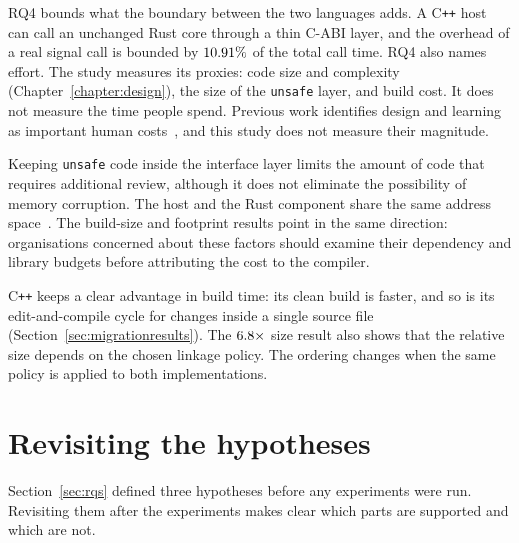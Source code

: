 \documentclass[english,oneside,a4paper,censored,csm,software-track-2020]{HYthesisML}
\begin{document}
RQ4 bounds what the boundary between the two languages adds. A C\texttt{++} host
can call an unchanged Rust core through a thin C-ABI layer, and the overhead of a
real signal call is bounded by $10.91\%$ of the total call time. RQ4
also names effort. The study measures its proxies: code size and complexity
(Chapter~\ref{chapter:design}), the size of the \texttt{unsafe} layer, and build
cost. It does not measure the time people spend. Previous work identifies design
and learning as important human costs~\cite{fulton2021adopting,crichton2024learning},
and this study does not measure their magnitude.

Keeping \texttt{unsafe} code inside the interface layer limits the amount of
code that requires additional review, although it does not eliminate the
possibility of memory corruption. The host and the Rust component share the
same address space~\cite{rivera2021galeed,kirth2022pkrusafe}. The build-size
and footprint results point in the same direction: organisations concerned about
these factors should examine their dependency and library budgets before
attributing the cost to the compiler.

C\texttt{++} keeps a clear advantage in build time: its clean build is faster, and so is its
edit-and-compile cycle for changes inside a single source file
(Section~\ref{sec:migrationresults}). The
$6.8\times$ size result also shows that the relative size depends
on the chosen linkage policy. The ordering changes when the same policy is
applied to both implementations.

\section{Revisiting the hypotheses}\label{sec:hypotheses}
Section~\ref{sec:rqs} defined three hypotheses before any experiments were run.
Revisiting them after the experiments makes clear which parts are supported and
which are not.
\end{document}
